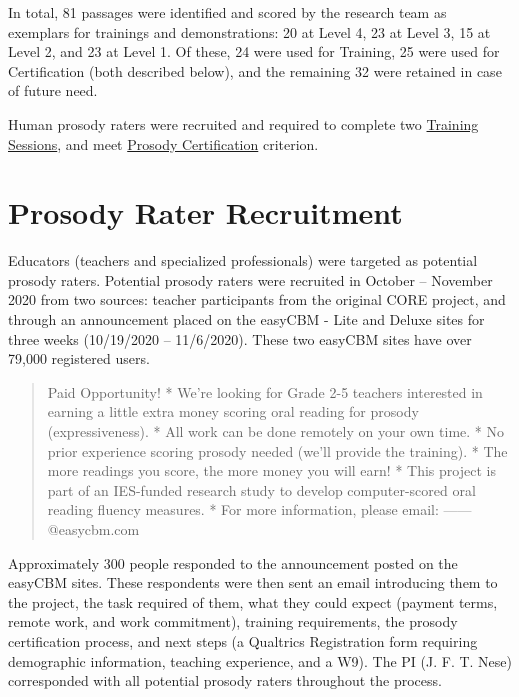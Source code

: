 \documentclass[
]{article}
\begin{document}
In total, 81 passages were identified and scored by the research team as
exemplars for trainings and demonstrations: 20 at Level 4, 23 at Level
3, 15 at Level 2, and 23 at Level 1. Of these, 24 were used for
Training, 25 were used for Certification (both described below), and the
remaining 32 were retained in case of future need.

Human prosody raters were recruited and required to complete two
\href{https://jnese.github.io/coreprosody/human_prosody_scoring.html\#training-development-implementation}{Training
Sessions}, and meet
\href{https://jnese.github.io/coreprosody/human_prosody_scoring.html\#prosody-certification}{Prosody
Certification} criterion.

\hypertarget{prosody-rater-recruitment}{%
\section{Prosody Rater Recruitment}\label{prosody-rater-recruitment}}

Educators (teachers and specialized professionals) were targeted as
potential prosody raters. Potential prosody raters were recruited in
October -- November 2020 from two sources: teacher participants from the
original CORE project, and through an announcement placed on the easyCBM
- Lite and Deluxe sites for three weeks (10/19/2020 -- 11/6/2020). These
two easyCBM sites have over 79,000 registered users.

\begin{quote}
Paid Opportunity! * We're looking for Grade 2-5 teachers interested in
earning a little extra money scoring oral reading for prosody
(expressiveness). * All work can be done remotely on your own time. * No
prior experience scoring prosody needed (we'll provide the training). *
The more readings you score, the more money you will earn! * This
project is part of an IES-funded research study to develop
computer-scored oral reading fluency measures. * For more information,
please email: ------@easycbm.com
\end{quote}

Approximately 300 people responded to the announcement posted on the
easyCBM sites. These respondents were then sent an email introducing
them to the project, the task required of them, what they could expect
(payment terms, remote work, and work commitment), training
requirements, the prosody certification process, and next steps (a
Qualtrics Registration form requiring demographic information, teaching
experience, and a W9). The PI (J. F. T. Nese) corresponded with all
potential prosody raters throughout the process.
\end{document}
